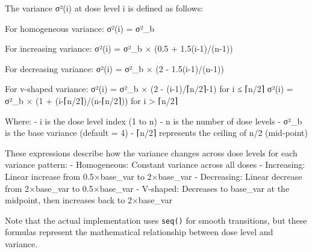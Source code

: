 \documentclass[
]{article}
\newenvironment{Shaded}{\begin{snugshade}}{\end{snugshade}}
\newcommand{\NormalTok}[1]{#1}
\newcommand{\SpecialStringTok}[1]{\textcolor[rgb]{0.31,0.60,0.02}{#1}}
\begin{document}
\begin{Shaded}
\begin{Highlighting}[]
\NormalTok{The variance σ²(i) at dose level i is defined as follows:}

\NormalTok{For homogeneous variance:}
\NormalTok{σ²(i) = σ²\_b}

\NormalTok{For increasing variance:}
\NormalTok{σ²(i) = σ²\_b × (0.5 + 1.5(i{-}1)/(n{-}1))}

\NormalTok{For decreasing variance:}
\NormalTok{σ²(i) = σ²\_b × (2 {-} 1.5(i{-}1)/(n{-}1))}

\NormalTok{For v{-}shaped variance:}
\NormalTok{σ²(i) = σ²\_b × (2 {-} (i{-}1)/⌈n/2⌉{-}1)     for i ≤ ⌈n/2⌉}
\NormalTok{σ²(i) = σ²\_b × (1 + (i{-}⌈n/2⌉)/(n{-}⌈n/2⌉))   for i \textgreater{} ⌈n/2⌉}

\NormalTok{Where:}
\SpecialStringTok{{-} }\NormalTok{i is the dose level index (1 to n)}
\SpecialStringTok{{-} }\NormalTok{n is the number of dose levels}
\SpecialStringTok{{-} }\NormalTok{σ²\_b is the base variance (default = 4)}
\SpecialStringTok{{-} }\NormalTok{⌈n/2⌉ represents the ceiling of n/2 (mid{-}point)}
\end{Highlighting}
\end{Shaded}

These expressions describe how the variance changes across dose levels
for each variance pattern: - Homogeneous: Constant variance across all
doses - Increasing: Linear increase from 0.5×base\_var to 2×base\_var -
Decreasing: Linear decrease from 2×base\_var to 0.5×base\_var -
V-shaped: Decreases to base\_var at the midpoint, then increases back to
2×base\_var

Note that the actual implementation uses \texttt{seq()} for smooth
transitions, but these formulas represent the mathematical relationship
between dose level and variance.
\end{document}
